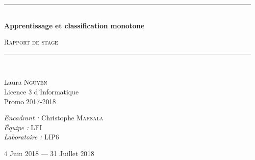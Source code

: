 \documentclass[a4paper]{article}
\newcommand{\HRule}{\rule{\linewidth}{0.5mm}}
\begin{document}
\begin{titlepage}
  \begin{center}


    \HRule \\[0.4cm]
    { \huge \bfseries Apprentissage et classification monotone\\[0.4cm] }

      \textsc{\LARGE Rapport de stage}\\[0.4cm]

    \HRule \\[0.4cm]

    \begin{minipage}{0.4\textwidth}
      \begin{flushleft} \large
        Laura \textsc{Nguyen}\\
        Licence 3 d'Informatique\\
        Promo 2017-2018 \\
      \end{flushleft}
    \end{minipage}
    \begin{minipage}{0.5\textwidth}
      \begin{flushright} \large
        \emph{Encadrant :} Christophe \textsc{Marsala}\\
        \emph{Équipe : } \textsc{LFI} \\
        \emph{Laboratoire : } \textsc{LIP6} \\

      \end{flushright}
    \end{minipage}

      \vspace{2cm}

    {\large 4 Juin 2018 — 31 Juillet 2018}

  \end{center}
\end{titlepage}
\end{document}
